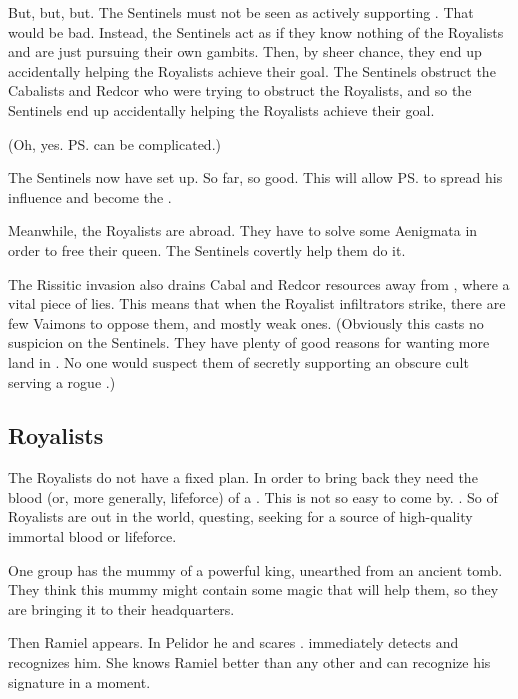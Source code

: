But, but, but. 
The Sentinels must not be seen as actively supporting \Belzir.
That would be bad. 
Instead, the Sentinels act as if they know nothing of the Royalists and are just pursuing their own gambits.
Then, by sheer chance, they  end up accidentally helping the Royalists achieve their goal. 
The Sentinels obstruct the Cabalists and Redcor who were trying to obstruct the Royalists, and so the Sentinels  end up accidentally helping the Royalists achieve their goal. 

(Oh, yes. 
\ps{\Secherdamon}  can be complicated.) 

The Sentinels now have \Nithdornazsh{} set up. 
So far, so good. 
This will allow \ps{\Vizsherioch} to spread his \vertex{} influence and become the . 

Meanwhile, the Royalists are abroad. 
They have to solve some Aenigmata in order to free their queen. 
The Sentinels covertly help them do it. 

The Rissitic invasion also drains Cabal and Redcor resources away from \Redce, where a vital piece of \Belzir{} lies. 
This means that when the \Redcean{} Royalist infiltrators strike, there are few Vaimons to oppose them, and mostly weak ones. 
(Obviously this casts no suspicion on the Sentinels. 
 They have plenty of good reasons for wanting more land in \Velcad.
 No one would suspect them of secretly supporting an obscure cult serving a rogue \resphan.) 





\subsection{Royalists}
The Royalists do not have a fixed plan. 
In order to bring \Belzir{} back they need the blood (or, more generally, lifeforce) of a \resphan. 
This is not so easy to come by. 
\Shiaraid{} . 
So  of Royalists are out in the world, questing, seeking for a source of high-quality immortal blood or lifeforce. 

One group has the mummy of a powerful \quiljaaran{} king, unearthed from an ancient tomb. 
They think this mummy might contain some magic that will help them, so they are bringing it to their headquarters. 

Then Ramiel appears.
In Pelidor he  and scares \Nzessuacrith. 
\Shiaraid{} immediately detects and recognizes him. 
She knows Ramiel better than any other and can recognize his \vertex{} signature in a moment. 

